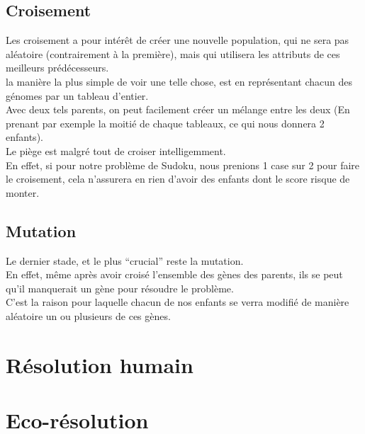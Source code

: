        \subsection{Croisement}
            Les croisement a pour intérêt de créer une nouvelle population, qui ne sera pas aléatoire (contrairement à la première), mais qui utilisera les attributs de ces meilleurs prédécesseurs.\\
            la manière la plus simple de voir une telle chose, est en représentant chacun des génomes par un tableau d'entier.\\
            Avec deux tels parents, on peut facilement créer un mélange entre les deux (En prenant par exemple la moitié de chaque tableaux, ce qui nous donnera 2 enfants).\\
            Le piège est malgré tout de croiser intelligemment.\\
            En effet, si pour notre problème de Sudoku, nous prenions 1 case sur 2 pour faire le croisement, cela n'assurera en rien d'avoir des enfants dont le score risque de monter.
        \subsection{Mutation}
            Le dernier stade, et le plus ``crucial'' reste la mutation.\\
            En effet, même après avoir croisé l'ensemble des gènes des parents, ils se peut qu'il manquerait un gène pour résoudre le problème.\\
            C'est la raison pour laquelle chacun de nos enfants se verra modifié de manière aléatoire un ou plusieurs de ces gènes.
    \section{Résolution humain}
    \section{Eco-résolution}
